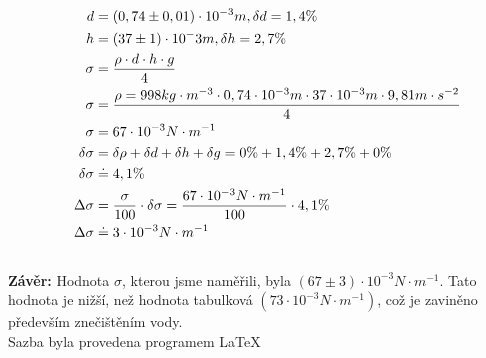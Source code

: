 \documentclass[12pt, a4paper]{article}
\begin{document}
\begin{align*}
    \mathllap{d} &= (0,74 \pm 0,01)\cdot 10^{-3} m, \delta d = 1,4\% \\
    \mathllap{h} &= (37 \pm 1)\cdot 10{^-}3 m, \delta h = 2,7\% \\
    \vspace{5em}
    \phantom{\delta \sigma}
    \phantom{\Delta \sigma}
    \mathllap{\sigma} &= \dfrac{\rho \cdot d \cdot h \cdot g}{4} \\
    \mathllap{\sigma} &= \dfrac{\rho = 998 kg \cdot m^{-3} \cdot 0,74 \cdot 10^{-3} m \cdot 37\cdot 10^{-3} m \cdot 9,81 m \cdot s^{-2}}{4} \\
    \mathllap{\sigma} &= 67 \cdot 10^{-3} N \cdot m^{-1} \\
    \vspace{2em}
    \mathllap{\delta \sigma} &= \delta \rho + \delta d + \delta h + \delta g = 0\% + 1,4\% + 2,7\% + 0\% \\
    \mathllap{\delta \sigma} &\doteq 4,1\% \\
    \vspace{2em}
    \mathllap{\Delta \sigma} &= \dfrac{\sigma}{100} \cdot \delta \sigma = \dfrac{67 \cdot 10^{-3} N \cdot m^{-1}}{100} \cdot 4,1\% \\
    \mathllap{\Delta \sigma} &\doteq 3 \cdot 10^{-3} N \cdot m^{-1}
\end{align*}\\[10pt]
\tab \textbf{Závěr: }
Hodnota $\sigma$, kterou jsme naměřili, byla $(67 \pm 3) \cdot 10^{-3} N \cdot m^{-1}$.
Tato hodnota je nižší, než hodnota tabulková $(73 \cdot 10^{-3} N \cdot m^{-1})$, což je zaviněno především znečištěním vody.\\[4pt]
Sazba byla provedena programem \LaTeX
\end{document}
